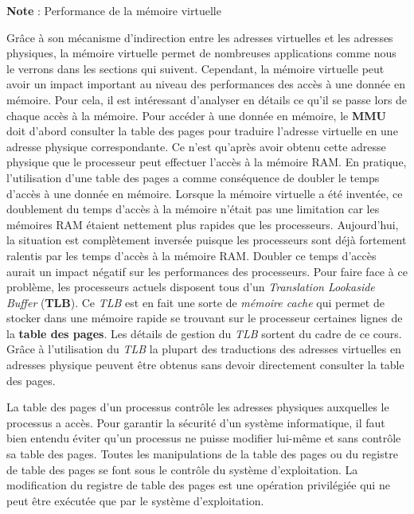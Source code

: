 \begin{framed}
    \textbf{Note} : Performance de la mémoire virtuelle \newline

    Grâce à son mécanisme d'indirection entre les adresses virtuelles
    et les adresses physiques, la mémoire virtuelle permet de nombreuses
    applications comme nous le verrons dans les sections qui suivent.
    Cependant, la mémoire virtuelle peut avoir un impact important au
    niveau des performances des accès à une donnée en mémoire. Pour cela,
    il est intéressant d'analyser en détails ce qu'il se passe lors de
    chaque accès à la mémoire. Pour accéder à une donnée en mémoire, le
    \textbf{MMU} doit d'abord consulter la table des pages pour
    traduire l'adresse virtuelle en une adresse physique correspondante.
    Ce n'est qu'après avoir obtenu cette adresse physique que le
    processeur peut effectuer l'accès à la mémoire RAM. En pratique,
    l'utilisation d'une table des pages a comme conséquence de doubler le
    temps d'accès à une donnée en mémoire. Lorsque la mémoire virtuelle a
    été inventée, ce doublement du temps d'accès à la mémoire n'était pas
    une limitation car les mémoires RAM étaient nettement plus rapides que
    les processeurs. Aujourd'hui, la situation est complètement inversée
    puisque les processeurs sont déjà fortement ralentis par les temps
    d'accès à la mémoire RAM. Doubler ce temps d'accès aurait un impact
    négatif sur les performances des processeurs. Pour faire face à ce
    problème, les processeurs actuels disposent tous d'un
    \textit{Translation Lookaside Buffer} (\textbf{TLB}). Ce
    \textit{TLB} est en fait une sorte de \textit{mémoire cache} qui permet
    de stocker dans une mémoire rapide se trouvant sur le processeur
    certaines lignes de la \textbf{table des pages}. Les détails de
    gestion du \textit{TLB} sortent du cadre de ce cours. Grâce à
    l'utilisation du \textit{TLB} la plupart des traductions des
    adresses virtuelles en adresses physique peuvent être obtenus sans
    devoir directement consulter la table des pages.
\end{framed}
  
La table des pages d'un processus contrôle les adresses physiques
auxquelles le processus a accès. Pour garantir la sécurité d'un
système informatique, il faut bien entendu éviter qu'un processus ne
puisse modifier lui-même et sans contrôle sa table des pages. Toutes
les manipulations de la table des pages ou du registre de table des
pages se font sous le contrôle du système d'exploitation. La
modification du registre de table des pages est une opération
privilégiée qui ne peut être exécutée que par le système
d'exploitation. \newline
  
